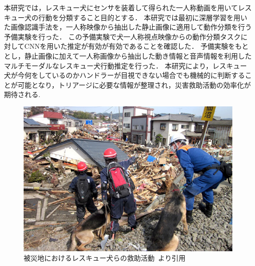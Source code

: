 本研究では，レスキュー犬にセンサを装着して得られた一人称動画を用いてレスキュー犬の行動を分類すること目的とする．
本研究では最初に深層学習を用いた画像認識手法を，一人称映像から抽出した静止画像に適用して動作分類を行う予備実験を行った．
この予備実験で犬一人称視点映像からの動作分類タスクに対してCNNを用いた推定が有効が有効であることを確認した．
予備実験をもととし，静止画像に加えて一人称画像から抽出した動き情報と音声情報を利用したマルチモーダルなレスキュー犬行動推定を行った．
本研究により，レスキュー犬が今何をしているのかハンドラーが目視できない場合でも機械的に判断することが可能となり，トリアージに必要な情報が整理され，災害救助活動の効率化が期待される.
\begin{figure}[htbp]
 \begin{center}
  \includegraphics[width=12cm]{./Figures/resque.eps}
  \caption{被災地におけるレスキュー犬らの救助活動~\cite{buycott}より引用}
  \label{resque}
 \end{center}
\end{figure}
